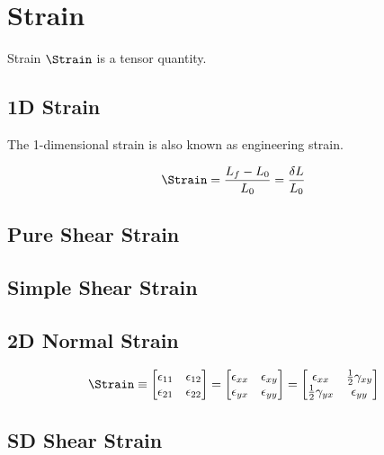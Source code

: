 \section{Strain}

Strain $\Strain$ is a tensor quantity.

\subsection{1D Strain}

The 1-dimensional strain is also known as engineering strain.

\begin{equation}
    \Strain = \frac{L_f - L_0}{L_0} = \frac{\delta L}{L_0}  
\end{equation}

\subsection{Pure Shear Strain}
\subsection{Simple Shear Strain}

\subsection{2D Normal Strain}

\begin{equation}
     \Strain \equiv 
     \begin{bmatrix} 
        \epsilon_{11} & \epsilon_{12} \\
        \epsilon_{21} & \epsilon_{22} \\
    \end{bmatrix}
    =
    \begin{bmatrix} 
        \epsilon_{xx} & \epsilon_{xy} \\
        \epsilon_{yx} & \epsilon_{yy} \\
    \end{bmatrix} 
    = 
    \begin{bmatrix} 
        \epsilon_{xx} & \frac{1}{2}\gamma_{xy} \\
        \frac{1}{2}\gamma_{yx} & \epsilon_{yy} \\
    \end{bmatrix} 
\end{equation}

\subsection{SD Shear Strain}

